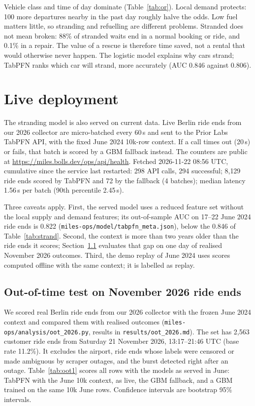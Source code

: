 \documentclass[11pt,a4paper]{article}
\newcommand{\livets}{2026-11-22 08:56 UTC}
\newcommand{\livecalls}{298}
\newcommand{\liveok}{294}
\newcommand{\livefallbackbatches}{4}
\newcommand{\liverowstabpfn}{8{,}129}
\newcommand{\liverowsfallback}{72}
\newcommand{\livepfifty}{1.56}
\newcommand{\livepninety}{2.45}
\begin{document}
Vehicle class and time of day dominate (Table~\ref{tab:or}). Local demand protects: 100 more departures nearby in the past day roughly halve the odds. Low fuel matters little, so stranding and refuelling are different problems. Stranded does not mean broken: 88\% of stranded waits end in a normal booking or ride, and 0.1\% in a repair. The value of a rescue is therefore time saved, not a rental that would otherwise never happen. The logistic model explains why cars strand; TabPFN ranks which car will strand, more accurately (AUC 0.846 against 0.806).

\section{Live deployment}\label{sec:live}

The stranding model is also served on current data. Live Berlin ride ends from our 2026 collector are micro-batched every 60\,s and sent to the Prior Labs TabPFN API, with the fixed June 2024 10k-row context. If a call times out (20\,s) or fails, that batch is scored by a GBM fallback instead. The counters are public at \url{https://miles.bolls.dev/ops/api/health}. Fetched \livets{}, cumulative since the service last restarted: \livecalls{} API calls, \liveok{} successful; \liverowstabpfn{} ride ends scored by TabPFN and \liverowsfallback{} by the fallback (\livefallbackbatches{} batches); median latency \livepfifty\,s per batch (90th percentile \livepninety\,s).

Three caveats apply. First, the served model uses a reduced feature set without the local supply and demand features; its out-of-sample AUC on 17--22 June 2024 ride ends is 0.822 (\texttt{miles-ops/model/tabpfn\_meta.json}), below the 0.846 of Table~\ref{tab:strand}. Second, the context is more than two years older than the ride ends it scores; Section~\ref{sec:oot} evaluates that gap on one day of realised November 2026 outcomes. Third, the demo replay of June 2024 uses scores computed offline with the same context; it is labelled as replay.

\subsection{Out-of-time test on November 2026 ride ends}\label{sec:oot}

We scored real Berlin ride ends from our 2026 collector with the frozen June 2024 context and compared them with realised outcomes (\texttt{miles-ops/analysis/oot\_2026.py}, results in \texttt{results/oot\_2026.md}). The set has 2{,}563 customer ride ends from Saturday 21 November 2026, 13:17--21:46 UTC (base rate 11.2\%). It excludes the airport, ride ends whose labels were censored or made ambiguous by scraper outages, and the burst detected right after an outage. Table~\ref{tab:oot1} scores all rows with the models as served in June: TabPFN with the June 10k context, as live, the GBM fallback, and a GBM trained on the same 10k June rows. Confidence intervals are bootstrap 95\% intervals.
\end{document}
